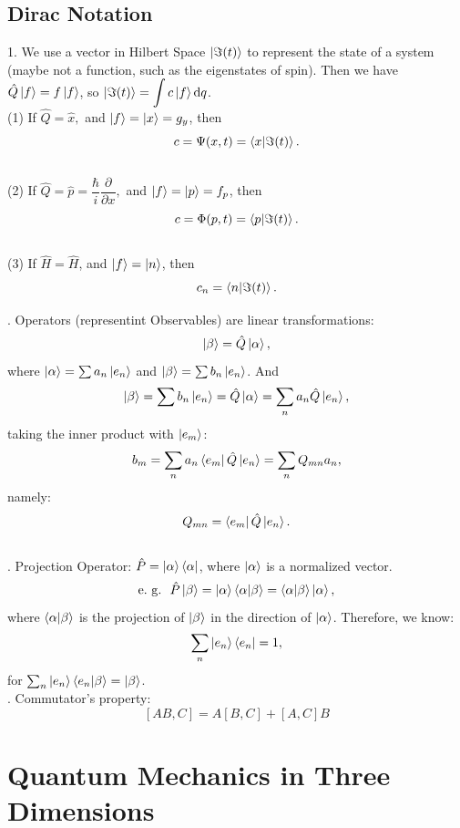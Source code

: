 \documentclass[12pt, 
]{article}
\begin{document}
\subsection{Dirac Notation}
1. We use a vector in Hilbert Space $\ket{\Im(t)}$ to represent the state of a system (maybe not a function, such as the eigenstates of spin). Then we have $\hat{Q}\ket{f}=f\ket{f}$, so $\ket{\Im(t)}=\displaystyle\int c\ket{f}{\rm d}q$.\\
(1) If $\hat{Q}=\hat{x},$ and $\ket{f}=\ket{x}=g_y$, then
\[
	c=\Psi(x,t)=\braket{x|\Im(t)}.
\]\\
(2) If $\hat{Q}=\hat{p}=\dfrac{\hbar}{i}\dfrac{\partial}{\partial x},$ and $\ket{f}=\ket{p}=f_p$, then
\[
	c=\Phi(p,t)=\braket{p|\Im(t)}.
\]\\
(3) If $\hat{H}=\hat{H}$, and $\ket{f}=\ket{n}$, then
\[
	c_n=\braket{n|\Im(t)}.
\]

. Operators (representint Observables) are linear transformations:
\[
	\ket{\beta}=\hat{Q}\ket{\alpha},
\]
where $\ket{\alpha}=\sum a_n\ket{e_n}$ and $\ket{\beta}=\sum b_n\ket{e_n}$. And
\[
	\ket{\beta}=\sum b_n\ket{e_n}=\hat{Q}\ket{\alpha}=\sum_n a_n\hat{Q}\ket{e_n},
\]
taking the inner product with $\ket{e_m}$:
\[
	b_m=\sum_n a_n\bra{e_m}\hat{Q}\ket{e_n}=\sum_n Q_{mn} a_n,
\]
namely:
\begin{equation}\label{eq:16}
	Q_{mn}=\bra{e_m}\hat{Q}\ket{e_n}.
\end{equation}
~\\

. Projection Operator: $\hat{P}=\ket{\alpha}\bra{\alpha}$, where $\ket{\alpha}$ is a normalized vector.
\[
	{\rm e.~g.~}~\hat{P}\ket{\beta}=\ket{\alpha}\braket{\alpha|\beta}=\braket{\alpha|\beta}\ket{\alpha},
\]
where $\braket{\alpha|\beta}$ is the projection of $\ket{\beta}$ in the direction of $\ket{\alpha}$. Therefore, we know:
\[
	\sum_n \ket{e_n}\bra{e_n}=1,
\]
for $\sum_n \ket{e_n}\braket{e_n|\beta}=\ket{\beta}$.
~\\

. Commutator's property: 
\begin{equation}\label{eq:17}
	[AB,C]=A[B,C]+[A,C]B
\end{equation}

\newpage

\section{Quantum Mechanics in Three Dimensions}
\end{document}
